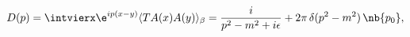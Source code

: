 \begin{equation}
\label{eq:propagator}
 D(p)=\intvierx \e^{ip(x-y)}\langle T A(x)A(y)\rangle_\beta=
 \frac{i}{p^2-m^2+i\epsilon}+2\pi\,\delta(p^2-m^2)\,\nb{p_0},
\end{equation}

